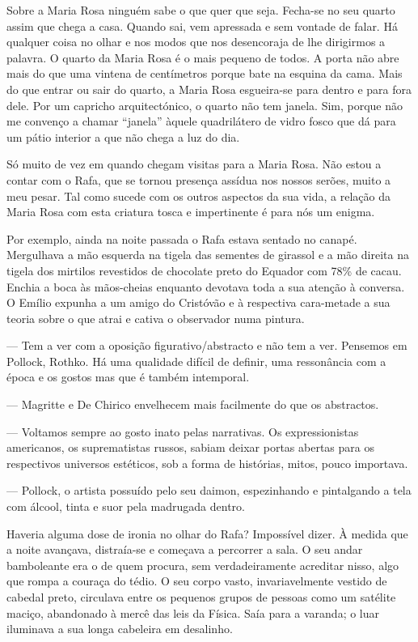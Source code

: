 Sobre a Maria Rosa ninguém sabe o que quer que seja. Fecha-se no seu
quarto assim que chega a casa. Quando sai, vem apressada e sem vontade
de falar. Há qualquer coisa no olhar e nos modos que nos desencoraja de
lhe dirigirmos a palavra. O quarto da Maria Rosa é o mais pequeno de
todos. A porta não abre mais do que uma vintena de centímetros porque
bate na esquina da cama. Mais do que entrar ou sair do quarto, a Maria
Rosa esgueira-se para dentro e para fora dele. Por um capricho
arquitectónico, o quarto não tem janela. Sim, porque não me convenço a
chamar ``janela'' àquele quadrilátero de vidro fosco que dá para um
pátio interior a que não chega a luz do dia.

Só muito de vez em quando chegam visitas para a Maria Rosa. Não estou a
contar com o Rafa, que se tornou presença assídua nos nossos serões,
muito a meu pesar. Tal como sucede com os outros aspectos da sua vida, a
relação da Maria Rosa
com esta criatura tosca e impertinente é para nós um enigma.

Por exemplo, ainda na noite passada o Rafa estava sentado no canapé.
Mergulhava a mão esquerda na tigela das sementes de girassol e a mão
direita na tigela dos mirtilos revestidos de chocolate preto do Equador
com 78\% de cacau. Enchia a boca às mãos-cheias enquanto devotava toda a
sua atenção à conversa. O Emílio expunha a um amigo do Cristóvão e à
respectiva cara-metade a sua teoria sobre o que atrai e cativa o
observador numa pintura.

--- Tem a ver com a oposição figurativo/abstracto e não tem a ver.
  Pensemos em Pollock, Rothko. Há uma qualidade difícil de definir, uma
  ressonância com a época e os gostos mas que é também intemporal.

--- Magritte e De Chirico envelhecem mais facilmente do que os abstractos.

--- Voltamos sempre ao gosto inato pelas narrativas. Os expressionistas
  americanos, os suprematistas russos, sabiam deixar portas abertas para
  os respectivos universos estéticos, sob a forma de histórias, mitos,
  pouco importava.

--- Pollock, o artista possuído pelo seu daimon, espezinhando e
  pintalgando a tela com álcool, tinta e suor pela madrugada dentro.


Haveria alguma dose de ironia no olhar do Rafa? Impossível dizer. À
medida que a noite avançava, distraía-se e começava a percorrer a sala.
O seu andar bamboleante era o de quem procura, sem verdadeiramente
acreditar nisso, algo que rompa a couraça do tédio. O seu corpo vasto,
invariavelmente vestido de cabedal preto, circulava entre os pequenos
grupos de pessoas como um satélite maciço, abandonado à mercê das leis
da Física. Saía para a varanda; o luar iluminava a sua longa cabeleira
em desalinho.

